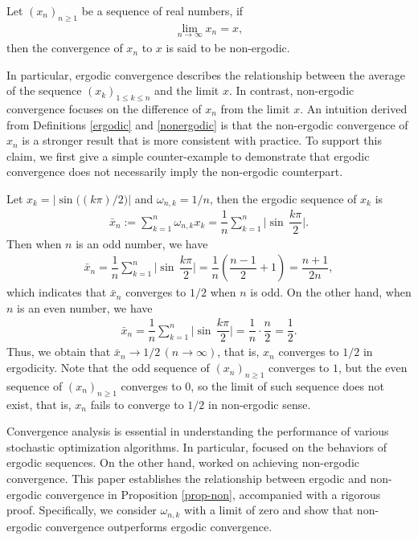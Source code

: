 \documentclass[twoside,11pt]{article}
\begin{document}
\begin{definition}\label{nonergodic}
Let $(x_{n})_{n\geq 1}$ be a sequence of real numbers, if 
\begin{align*}
	\lim_{n\to\infty}x_{n}=x,
\end{align*}
then the convergence of $x_{n}$ to $x$ is said to be non-ergodic.
\end{definition}
\par In particular, ergodic convergence describes the relationship between the average of the sequence $(x_{k})_{1\leq k\leq n}$ and the limit $x$. In contrast, non-ergodic convergence focuses on the difference of $x_{n}$ from the limit $x$. An intuition derived from Definitions \ref{ergodic} and \ref{nonergodic} is that the non-ergodic convergence of $x_{n}$ is a stronger result that is more consistent with practice. To support this claim, we first give a simple counter-example to demonstrate that ergodic convergence does not necessarily imply the non-ergodic counterpart.
\begin{example}
Let $x_{k}=\lvert \sin \big((k\pi)/2\big)\rvert$ and $\omega_{n,k}=1/n$, then the ergodic sequence of $x_{k}$ is 
\begin{align*}
	\bar{x}_{n}
	:=
	\sum_{k=1}^{n}\omega_{n,k} 
	x_{k}
	=\dfrac{1}{n}
	\sum_{k=1}^{n}
	\Big\lvert \sin\,\dfrac{k\pi}{2}
	\Big\rvert.
\end{align*}
Then when $n$ is an odd number, we have
\begin{align*}
	\bar{x}_{n}
	=\dfrac{1}{n}
	\sum_{k=1}^{n}
	\Big\lvert \sin\,\dfrac{k\pi}{2}\Big\rvert
	=\dfrac{1}{n}
	\left(\dfrac{n-1}{2}+1\right)
	=\dfrac{n+1}{2n},
\end{align*}
which indicates that $\bar{x}_{n}$ converges to $1/2$ when $n$ is odd. On the other hand, when $n$ is an even number, we have 
\begin{align*}
	\bar{x}_{n}
	=\dfrac{1}{n}
	\sum_{k=1}^{n}
	\Big\lvert \sin\,\dfrac{k\pi}{2}\Big\rvert
	=\dfrac{1}{n}
	\cdot
	\dfrac{n}{2}
	=\dfrac{1}{2}.
\end{align*}
Thus, we obtain that $\bar{x}_{n}\to 1/2\,(n\to\infty)$, that is, $x_{n}$ converges to $1/2$ in ergodicity. Note that the odd sequence of $(x_{n})_{n\geq 1}$ converges to $1$, but the even sequence of $(x_{n})_{n\geq 1}$ converges to $0$, so the limit of such sequence does not exist, that is, $x_{n}$ fails to converge to $1/2$ in non-ergodic sense.
\end{example}
\par Convergence analysis is essential in understanding the performance of various stochastic optimization algorithms. In particular,  \citet{chambolle2016ergodic,ward2020adagrad,huang2021super} focused on the behaviors of ergodic sequences. On the other hand,  \citet{sun2019non,sun2020novel,he2022revisit,LIU202327} worked on achieving non-ergodic convergence. This paper establishes the relationship between ergodic and non-ergodic convergence in Proposition \ref{prop-non}, accompanied with a rigorous proof. Specifically, we consider $\omega_{n,k}$ with a limit of zero and show that non-ergodic convergence outperforms ergodic convergence.
\end{document}

